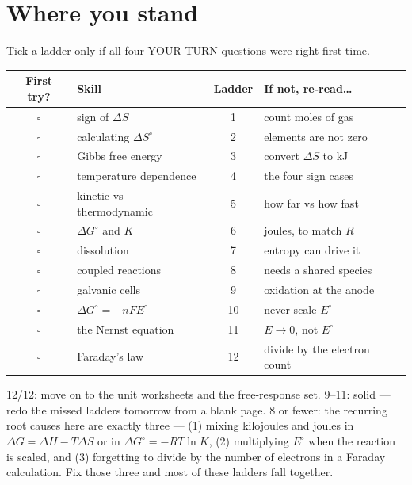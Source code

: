 \documentclass{apchem-worksheet}
\begin{document}
\section*{\sffamily Where you stand}

Tick a ladder only if all four YOUR TURN questions were right first time.

\renewcommand{\arraystretch}{1.30}
\noindent\begin{tabular}{@{}c p{6.0cm} c >{\raggedright\arraybackslash}p{4.9cm}@{}}
\toprule
\textbf{First try?} & \textbf{Skill} & \textbf{Ladder} &
  \textbf{If not, re-read\ldots}\\
\midrule
$\square$ & sign of $\Delta S$ & 1 & count moles of gas \\
$\square$ & calculating $\Delta S^\circ$ & 2 & elements are not zero \\
$\square$ & Gibbs free energy & 3 & convert $\Delta S$ to kJ \\
$\square$ & temperature dependence & 4 & the four sign cases \\
$\square$ & kinetic vs thermodynamic & 5 & how far vs how fast \\
$\square$ & $\Delta G^\circ$ and $K$ & 6 & joules, to match $R$ \\
$\square$ & dissolution & 7 & entropy can drive it \\
$\square$ & coupled reactions & 8 & needs a shared species \\
$\square$ & galvanic cells & 9 & oxidation at the anode \\
$\square$ & $\Delta G^\circ = -nFE^\circ$ & 10 & never scale $E^\circ$ \\
$\square$ & the Nernst equation & 11 & $E \to 0$, not $E^\circ$ \\
$\square$ & Faraday's law & 12 & divide by the electron count \\
\bottomrule
\end{tabular}

\begin{apcnote}
12/12: move on to the unit worksheets and the free-response set.
9--11: solid --- redo the missed ladders tomorrow from a blank page.
8 or fewer: the recurring root causes here are exactly three ---
(1) mixing kilojoules and joules in $\Delta G = \Delta H - T\Delta S$ or
in $\Delta G^\circ = -RT\ln K$, (2) multiplying $E^\circ$ when the
reaction is scaled, and (3) forgetting to divide by the number of
electrons in a Faraday calculation. Fix those three and most of these
ladders fall together.
\end{apcnote}
\end{document}
